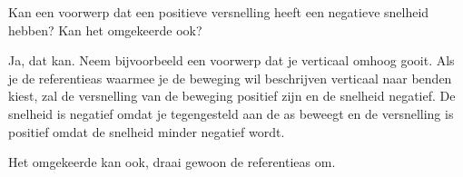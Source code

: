 \documentclass{ximera}
\begin{document}
\begin{exercise}
	Kan een voorwerp dat een positieve versnelling heeft een negatieve snelheid hebben? Kan het omgekeerde ook?%
	\begin{oplossing}
		Ja, dat kan. Neem bijvoorbeeld een voorwerp dat je verticaal omhoog gooit. Als je de referentieas waarmee je de beweging wil beschrijven verticaal naar benden kiest, zal de versnelling van de beweging positief zijn en de snelheid negatief. De snelheid is negatief omdat je tegengesteld aan de as beweegt en de versnelling is positief omdat de snelheid minder negatief wordt.

		Het omgekeerde kan ook, draai gewoon de referentieas om.
	\end{oplossing}
\end{exercise}
\end{document}
